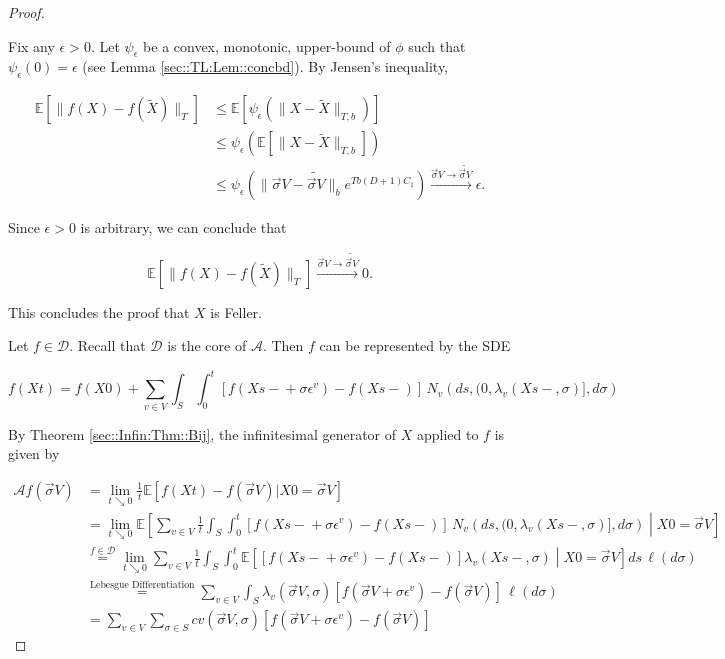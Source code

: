 \documentclass[12pt]{article}
\newcommand{\mb}{\mathbb}
\newcommand{\mc}{\mathcal}
\newcommand{\ra}{\rightarrow}
\newcommand{\os}{\overset}
\newcommand{\te}{\text}
\newcommand{\ep}{\epsilon}
\newcommand{\ind}{\hspace{24pt}}
\newcommand{\ex}[1]{\mb{E}\left[#1\right]}			%
\renewcommand{\v}{v}							%
\renewcommand{\S}{S}							%
\newcommand{\s}{\sigma}							%
\newcommand{\sv}{\vec{\s}}						%
\renewcommand{\b}{b}							%
\newcommand{\ev}[1]{\ep^{#1}}					%
\newcommand{\T}{T}								%
\renewcommand{\t}{t}							%
\renewcommand{\tt}{s}							%
\newcommand{\X}{X}								%
\newcommand{\IG}{\mc{A}}						%
\newcommand{\IGr}{c}							%
\newcommand{\degr}{D}								%
\newcommand{\poiss}[1]{N_{#1}}						%
\newcommand{\core}{\mc{D}}							%
\newcommand{\XState}[1]{\S^{#1}}				%
\newcommand{\rate}[1]{\lambda_{#1}}					%
\newcommand{\const}[1]{C_{#1}}						%
\newcommand{\Sm}{\ell}								%
\newcommand{\alt}{\widetilde}						%
\begin{document}
\begin{proof}
\begin{enumerate}[(a)]
\ind Fix any \(\ep > 0\). Let \(\psi_\ep\) be a convex, monotonic, upper-bound of \(\phi\) such that \(\psi_\ep(0) = \ep\) (see Lemma \ref{sec::TL:Lem::concbd}). By Jensen's inequality,

\begin{align*}
\ex{\|f(\X{}{}) - f(\alt{\X{}{}})\|_\T} &\leq \ex{\psi_\ep\left(\|\X{}{} - \alt{\X{}{}}\|_{\T,\b{}}\right)}\\
&\leq \psi_\ep\left(\ex{\|\X{}{} - \alt{\X{}{}}\|_{\T,\b{}}}\right)\\
&\leq \psi_\ep\left(\|\sv{}{ V} - \alt{\sv{}{ V}}\|_{\b{}}e^{\T\b{}(\degr+1)\const{1}}\right) \os{\sv{}{ V} \ra\alt{\sv{}{ V}}}{\ra} \ep.
\end{align*}

Since \(\ep > 0\) is arbitrary, we can conclude that 

\[\ex{\|f(\X{}{}) - f(\alt{\X{}{}})\|_\T} \os{\sv{}{ V} \ra\alt{\sv{}{ V}}}{\ra} 0.\]

This concludes the proof that \(\X{}{}\) is Feller.
\end{enumerate}

Let \(f \in \core\). Recall that \(\core\) is the core of \(\IG\). Then \(f\) can be represented by the SDE

\[f(\X{}{\t}) = f(\X{}{0}) + \sum_{\v \in  V} \int_\S\int_0^\t [f(\X{}{\tt-} + \s\ev{\v}) - f(\X{}{\tt-})]\,\poiss{\v}\left(d\tt,(0,\rate{\v}(\X{}{\tt-},\s)],d\s\right)\]


By Theorem \ref{sec::Infin:Thm::Bij}, the infinitesimal generator of \(\X{}{}\) applied to \(f\) is given by 

\begin{align*}
\IG f(\sv{}{ V}) &= \lim_{\t \searrow 0} \frac{1}{\t} \ex{f(\X{}{\t}) - f(\sv{}{ V})|\X{}{0} = \sv{}{ V}}\\
&= \lim_{\t \searrow 0} \ex{\sum_{\v \in  V} \frac{1}{\t}\int_\S\int_0^\t \left[f(\X{}{\tt-} + \s\ev{\v}) - f(\X{}{\tt-})\right]\,\poiss{\v}\left(d\tt,(0,\rate{\v}(\X{}{\tt-},\s)],d\s\right)\middle|\X{}{0} = \sv{}{ V}}\\
&\os{f \in \mc{D}}{=} \lim_{\t \searrow 0}\sum_{\v \in  V} \frac{1}{\t}\int_\S\int_0^\t \ex{\left[f(\X{}{\tt-} + \s\ev{\v}) - f(\X{}{\tt-})\right]\rate{\v}(\X{}{\tt-},\s)\middle|\X{}{0} = \sv{}{ V}}d\tt\,\Sm(d\s)\\
&\os{\te{Lebesgue Differentiation}}{=} \sum_{\v \in  V} \int_\S \rate{\v}(\sv{}{ V},\s)[f(\sv{}{ V} + \s\ev{\v}) - f(\sv{}{ V})]\,\Sm(d\s)\\
&= \sum_{\v \in  V} \sum_{\s \in \S} \IGr{\v}(\sv{}{ V},\s)[f(\sv{}{ V} + \s\ev{\v}) - f(\sv{}{ V})]
\end{align*}
\end{proof}
\end{document}
